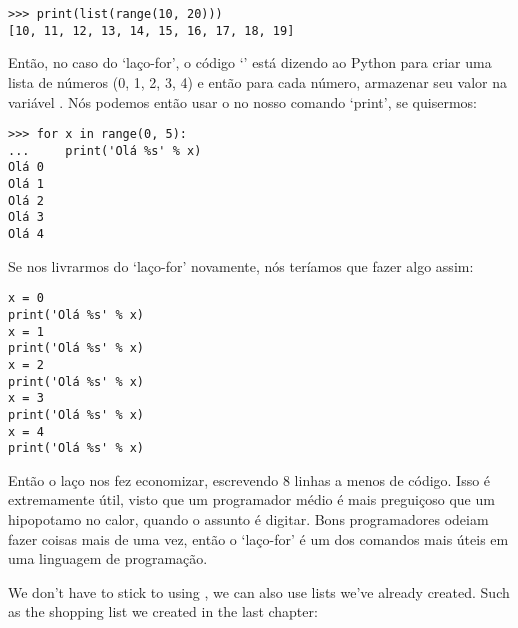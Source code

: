 \begin{listing}
\begin{verbatim}
>>> print(list(range(10, 20)))
[10, 11, 12, 13, 14, 15, 16, 17, 18, 19]
\end{verbatim}
\end{listing}

Então, no caso do `laço-for', o código `' está dizendo ao Python para criar uma lista de números (0, 1, 2, 3, 4) e então para cada número, armazenar seu valor na variável . Nós podemos então usar o  no nosso comando `print', se quisermos:

\begin{listing}
\begin{verbatim}
>>> for x in range(0, 5):
...     print('Olá %s' % x)
Olá 0
Olá 1
Olá 2
Olá 3
Olá 4
\end{verbatim}
\end{listing}

Se nos livrarmos do `laço-for' novamente, nós teríamos que fazer algo assim:

\begin{listing}
\begin{verbatim}
x = 0
print('Olá %s' % x)
x = 1
print('Olá %s' % x)
x = 2
print('Olá %s' % x)
x = 3
print('Olá %s' % x)
x = 4
print('Olá %s' % x)
\end{verbatim}
\end{listing}

Então o laço nos fez economizar, escrevendo 8 linhas a menos de código. Isso é extremamente útil, visto que um programador médio é mais preguiçoso que um hipopotamo no calor, quando o assunto é digitar. Bons programadores odeiam fazer coisas mais de uma vez, então o `laço-for' é um dos comandos mais úteis em uma linguagem de programação.

\linebreak
\par
We don't have to stick to using , we can also use lists we've already created.  Such as the shopping list we created in the last chapter:

